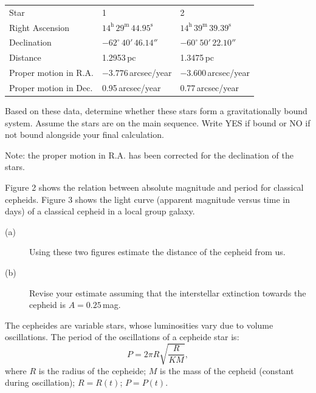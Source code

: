 \begin{center}
\begin{tabular}{lll}
Star & 1 & 2 \\
Right Ascension & $14^\mathrm{h}\,29^\mathrm{m}\,44.95^\mathrm{s}$
  & $14^\mathrm{h}\,39^\mathrm{m}\,39.39^\mathrm{s}$ \\
Declination & $-62^\circ\,40'\,46.14''$ & $-60^\circ\,50'\,22.10''$ \\
Distance & 1.2953\,pc & 1.3475\,pc \\
Proper motion in R.A. & $-3.776$\,arcsec/year & $-3.600$\,arcsec/year \\
Proper motion in Dec. & 0.95\,arcsec/year & 0.77\,arcsec/year \\
\end{tabular}
\end{center}

Based on these data, determine whether these stars form a gravitationally
bound system. Assume the stars are on the main sequence. Write YES if bound
or NO if not bound alongside your final calculation.

Note: the proper motion in R.A. has been corrected for the declination of
the stars.

Figure 2 shows the relation between absolute magnitude and period for
classical cepheids. Figure 3 shows the light curve (apparent magnitude versus
time in days) of a classical cepheid in a local group galaxy.

\begin{description}
\item[(a)] Using these two figures estimate the distance of the cepheid from
  us.
\item[(b)] Revise your estimate assuming that the interstellar extinction
  towards the cepheid is $A = 0.25$\,mag.
\end{description}

The cepheides are variable stars, whose luminosities vary due to volume
oscillations. The period of the oscillations of a cepheide star is:
\[ P = 2\pi R \sqrt{\frac{R}{KM}}, \]
where $R$ is the radius of the cepheide; $M$ is the mass of the cepheid
(constant during oscillation); $R = R(t)$; $P = P(t)$.

